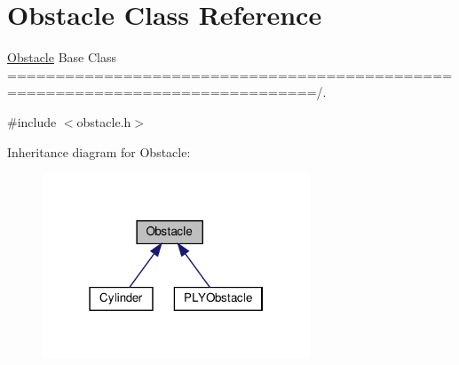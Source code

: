 \hypertarget{class_obstacle}{}\section{Obstacle Class Reference}
\label{class_obstacle}


\hyperlink{class_obstacle}{Obstacle} Base Class ==============================================================================/.  




{\ttfamily \#include $<$obstacle.\+h$>$}



Inheritance diagram for Obstacle\+:\nopagebreak
\begin{figure}[H]
\begin{center}
\leavevmode
\includegraphics[width=226pt]{class_obstacle__inherit__graph}
\end{center}
\end{figure}
